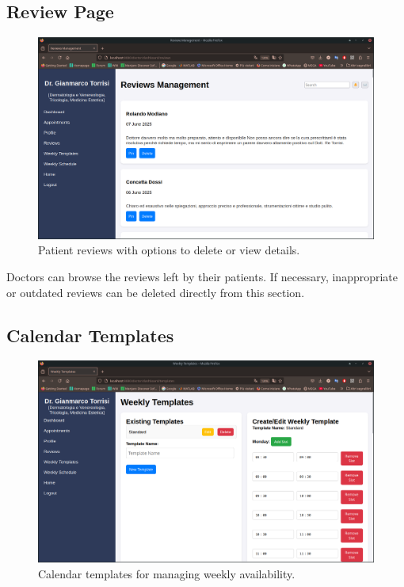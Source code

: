 \subsection{Review Page}

\begin{figure}[!h]
	\centering
	\includegraphics[scale=0.30]{resources/screenshots/doctor_ui/reviews.png}
	\caption{Patient reviews with options to delete or view details.}
	\label{fig:patient_reviews}
\end{figure}

Doctors can browse the reviews left by their patients. If necessary, inappropriate or outdated reviews can be deleted directly from this section.

\subsection{Calendar Templates}

\begin{figure}
	\centering
	\includegraphics[scale=0.30]{resources/screenshots/doctor_ui/template.png}
	\caption{Calendar templates for managing weekly availability.}
	\label{fig:calendar_templates}
\end{figure}

